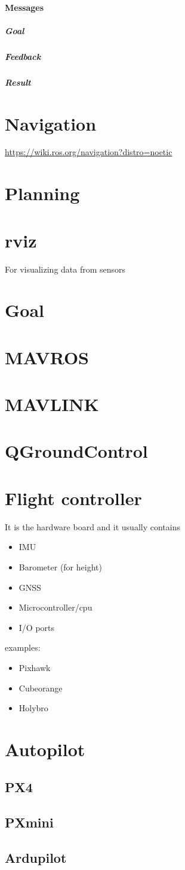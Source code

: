     \paragraph{Messages}
        \subparagraph{Goal}
        \subparagraph{Feedback}
        \subparagraph{Result}

\section{Navigation}
    \url{https://wiki.ros.org/navigation?distro=noetic}

\section{Planning}
\section{rviz}
    For visualizing data from sensors

\section{Goal}
\section{MAVROS}
\section{MAVLINK}
\section{QGroundControl}
\section{Flight controller}
    It is the hardware board and it usually contains
    \begin{itemize}
        \item IMU
        \item Barometer (for height)
        \item GNSS
        \item Microcontroller/cpu
        \item I/O ports
    \end{itemize}

    examples:
    \begin{itemize}
        \item Pixhawk
        \item Cubeorange
        \item Holybro
    \end{itemize}

\section{Autopilot}
    \subsection{PX4}
        \subsection{PXmini}
    \subsection{Ardupilot}